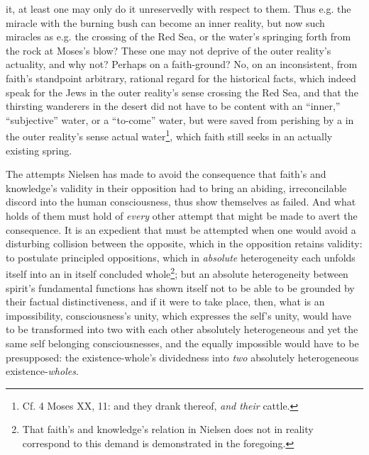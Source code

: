 \documentclass[12pt,a4paper]{book}
\begin{document}
it, at least one may only do it unreservedly with respect to them. Thus e.g. the miracle with the burning bush can become an
inner reality, but now such miracles as e.g. the crossing of the Red Sea, or the water's springing forth from the rock at
Moses's blow? These one may not deprive of the outer reality's actuality, and why not? Perhaps on a faith-ground? No, on an
inconsistent, from faith's standpoint arbitrary, rational regard for the historical facts, which indeed speak for the Jews
in the outer reality's sense crossing the Red Sea, and that the thirsting wanderers in the desert did not have to be content
with an ``inner,'' ``subjective'' water, or a ``to-come'' water, but were saved from perishing by a in the outer reality's
sense actual water\footnote{Cf. 4 Moses XX, 11: and they drank thereof, \emph{and their} cattle.}, which faith still seeks in an
actually existing spring.

The attempts Nielsen has made to avoid the consequence that faith's and knowledge's validity in their opposition had to
bring an abiding, irreconcilable discord into the human consciousness, thus show themselves as failed. And what holds of
them must hold of \emph{every} other attempt that might be made to avert the consequence. It is an expedient that must be
attempted when one would avoid a disturbing collision between the opposite, which in the opposition retains validity: to
postulate principled oppositions, which in \emph{absolute} heterogeneity each unfolds itself into an in itself concluded
whole\footnote{That faith's and knowledge's relation in Nielsen does not in reality correspond to this demand is demonstrated
in the foregoing.}; but an absolute heterogeneity between spirit's fundamental functions has shown itself not to be able to
be grounded by their factual distinctiveness, and if it were to take place, then, what is an impossibility, consciousness's
unity, which expresses the self's unity, would have to be transformed into two with each other absolutely heterogeneous and
yet the same self belonging consciousnesses, and the equally impossible would have to be presupposed: the existence-whole's
dividedness into \emph{two} absolutely heterogeneous existence-\emph{wholes}.
\end{document}
